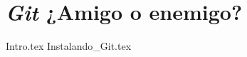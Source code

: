 \chapter{\textit{Git} ¿Amigo o enemigo?}
    {Intro.tex}
    {Instalando_Git.tex}
    \nocite{*}
    \printbibliography[keyword=git]
